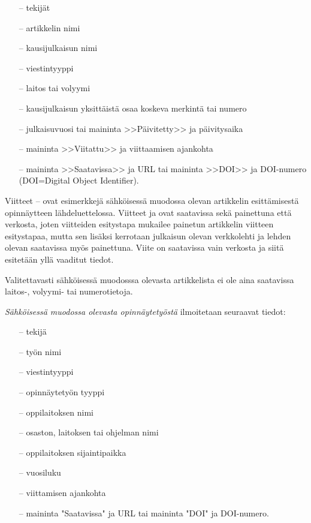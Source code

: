 \documentclass[finnish, 12pt, a4paper, elec, utf8, a-1b, online]{aaltothesis}
\begin{document}
\begin{itemize}
\item[--]tekijät
\item[--]artikkelin nimi
\item[--]kausijulkaisun nimi
\item[--]viestintyyppi
\item[--]laitos tai volyymi
\item[--]kausijulkaisun yksittäistä osaa koskeva merkintä tai numero
\item[--]julkaisuvuosi tai maininta >>Päivitetty>> ja päivitysaika
\item[--]maininta >>Viitattu>> ja viittaamisen ajankohta
\item[--]maininta >>Saatavissa>> ja URL tai
        maininta >>DOI>> ja DOI-numero (DOI=Digital Object Identifier).
\end{itemize}

Viitteet \cite{Ribeiro}--\cite{kone} ovat esimerkkejä sähköisessä
muodossa olevan artikkelin esittämisestä opinnäytteen
lähdeluettelossa.  Viitteet \cite{Ribeiro} ja \cite{Stieber} ovat
saatavissa sekä painettuna että verkosta, joten viitteiden esitystapa
mukailee painetun artikkelin viitteen esitystapaa, mutta sen lisäksi
kerrotaan julkaisun olevan verkkolehti ja lehden olevan saatavissa
myös painettuna.  Viite \cite{kone} on saatavissa vain verkosta ja
siitä esitetään yllä vaaditut tiedot.

Valitettavasti sähköisessä muodosssa olevasta artikkelista ei ole aina
saatavissa lai\-tos-, volyymi- tai numerotietoja.

\textit{Sähköisessä muodossa olevasta opinnäytetyöstä} ilmoitetaan
seuraavat tiedot:

\begin{itemize}
\item[--]tekijä
\item[--]työn nimi
\item[--]viestintyyppi
\item[--]opinnäytetyön tyyppi
\item[--]oppilaitoksen nimi
\item[--]osaston, laitoksen tai ohjelman nimi
\item[--]oppilaitoksen sijaintipaikka
\item[--]vuosiluku
\item[--]viittamisen ajankohta
\item[--]maininta "Saatavissa" ja URL tai
        maininta "DOI" ja DOI-numero.
\end{itemize}
\end{document}
